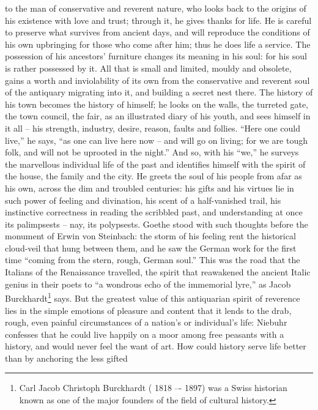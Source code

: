  to the man of conservative and
reverent nature, who looks back to the origins of his existence with
love and trust; through it, he gives thanks for life. He is careful
to preserve what survives from ancient days, and will reproduce the
conditions of his own upbringing for those who come after him; thus
he does life a service. The possession of his ancestors' furniture
changes its meaning in his soul: for his soul is rather possessed by
it. All that is small and limited, mouldy and obsolete, gains a worth
and inviolability of its own from the conservative and reverent soul
of the antiquary migrating into it, and building a secret nest there.
The history of his town becomes the history of himself; he looks on
the walls, the turreted gate, the town council, the fair, as an
illustrated diary of his youth, and sees himself in it all -- his
strength, industry, desire, reason, faults and follies. \enquote{Here one
could live,} he says, \enquote{as one can live here now -- and will go on
living; for we are tough folk, and will not be uprooted in the
night.} And so, with his \enquote{we,} he surveys the marvellous individual
life of the past and identifies himself with the spirit of the house,
the family and the city. He greets the soul of his people from afar
as his own, across the dim and troubled centuries: his gifts and his
virtues lie in such power of feeling and divination, his scent of a
half-vanished trail, his instinctive correctness in reading the
scribbled past, and understanding at once its palimpsests -- nay, its
polypsests. Goethe stood with such thoughts before the monument of
Erwin von Steinbach: the storm of his feeling rent the historical
cloud-veil that hung between them, and he saw the German work for the
first time \enquote{coming from the stern, rough, German soul.} This was the
road that the Italians of the Renaissance travelled, the spirit that
reawakened the ancient Italic genius in their poets to \enquote{a wondrous
echo of the immemorial lyre,} as Jacob Burckhardt\footnote{Carl Jacob Christoph Burckhardt ( 1818 –- 1897) was a Swiss historian known as one of the major founders of the field of cultural history.} says. But the
greatest value of this antiquarian spirit of reverence lies in the
simple emotions of pleasure and content that it lends to the drab,
rough, even painful circumstances of a nation's or individual's life:
Niebuhr confesses that he could live happily on a moor among free
peasants with a history, and would never feel the want of art. How
could history serve life better than by anchoring the less gifted
